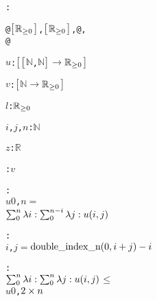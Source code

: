 \begin{alltt}
: 

   @\({\pvsbracketl}\)\({\pvssubscript{\mathbb{R}}{{\geq}0}}\)\({\pvsbracketr}\), \({\pvsbracketl}\)\({\pvssubscript{\mathbb{R}}{{\geq}0}}\)\({\pvsbracketr}\), @,
            @

  \(u\):  \({\pvsbracketl}\)\({\pvsbracketl}\)\(\mathbb{N}\), \(\mathbb{N}\)\({\pvsbracketr}\) \(\rightarrow\) \({\pvssubscript{\mathbb{R}}{{\geq}0}}\)\({\pvsbracketr}\)\vspace*{\pvsdeclspacing}

  \(v\):  \({\pvsbracketl}\)\(\mathbb{N}\) \(\rightarrow\) \({\pvssubscript{\mathbb{R}}{{\geq}0}}\)\({\pvsbracketr}\)\vspace*{\pvsdeclspacing}

  \(l\):  \({\pvssubscript{\mathbb{R}}{{\geq}0}}\)\vspace*{\pvsdeclspacing}

  \(i\), \(j\), \(n\):  \(\mathbb{N}\)\vspace*{\pvsdeclspacing}

  \(z\):  \(\mathbb{R}\)\vspace*{\pvsdeclspacing}

  :  \pvsid{(}\pvsid{(}\(v\)\pvsid{)}\pvsid{)}\vspace*{\pvsdeclspacing}

  : 
    \pvsid{(}\pvsid{(}\(u\)\pvsid{)}\pvsid{)}\pvsid{(}\pvsid{(}\(0\), \(n\)\pvsid{)}\pvsid{)} \(=\)
     \(\sigmathreefn{0}{n}{\lambda i: \sigmathreefn{0}{\opdifferencetwofn{n}{i}}{\lambda j: u\pvsid{(}i, j\pvsid{)}}}\)\vspace*{\pvsdeclspacing}

  : 
    \pvsid{(}\(i\), \(j\)\pvsid{)} \(=\) \(\opdifferencetwofn{\pvsid{double\_index\_n}\pvsid{(}0, \opplustwofn{i}{j}\pvsid{)}}{i}\)\vspace*{\pvsdeclspacing}

  : 
    \(\sigmathreefn{0}{n}{\lambda i: \sigmathreefn{0}{n}{\lambda j: u\pvsid{(}i, j\pvsid{)}}}\) \(\leq\)
     \pvsid{(}\pvsid{(}\(u\)\pvsid{)}\pvsid{)}\pvsid{(}\pvsid{(}\(0\), \(\optimestwofn{2}{n}\)\pvsid{)}\pvsid{)}\vspace*{\pvsdeclspacing}


\end{alltt}
